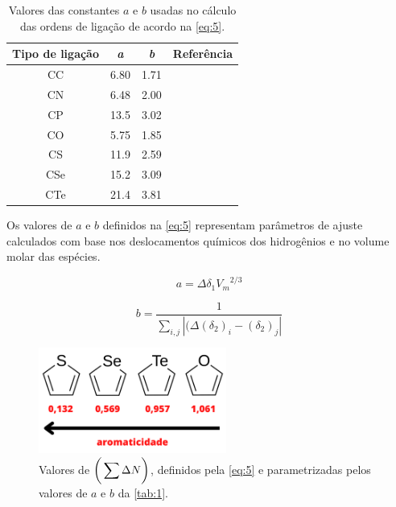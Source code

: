 \begin{table}[htb]
	\centering
	\caption{\label{tab:1} Valores das constantes $a$ e $b$ usadas no cálculo das ordens de ligação de acordo na \autoref{eq:5}.}
	\begin{tabular}{cccc}
		\toprule
		\textbf{Tipo de ligação} & \textbf{\textit{a}} & \textbf{\textit{b}} & \textbf{Referência}
		\\ 
		\midrule
        CC & 6.80 & 1.71 & \cite{Gordy1947} \\
        CN & 6.48 & 2.00 & \cite{Gordy1947} \\
        CP & 13.5 & 3.02 & \cite{Gordy1947} \\
        CO & 5.75 & 1.85 & \cite{Gordy1947} \\
        CS & 11.9 & 2.59 & \cite{Gordy1947} \\
        CSe & 15.2 & 3.09 & \cite{Fringuelli1974}\\
        CTe & 21.4 & 3.81 & \cite{Fringuelli1974}\\
    \bottomrule
	\end{tabular}
\end{table}



Os valores de $a$ e $b$ definidos na \autoref{eq:5} representam parâmetros de ajuste calculados com base nos deslocamentos químicos dos hidrogênios e no volume molar das espécies.

\begin{equation}
    a = \Delta \delta_1 {V_m}^{2/3}
\end{equation}

\begin{equation}
    b = \frac{1}{\displaystyle \sum_{i,j} |(\Delta (\delta_2)_i - (\delta_2)_j|}
\end{equation}


\begin{figure}[htb]
	\caption{\label{fig:4} Valores de $\bigg{(} \displaystyle \sum \Delta N \bigg{)}$, definidos pela \autoref{eq:5} e parametrizadas pelos valores de $a$ e $b$ da \autoref{tab:1}.}
	\begin{center}
		\includegraphics[width=0.55\textwidth]{images/aromaticity(1).png}
	\end{center}
\end{figure}

